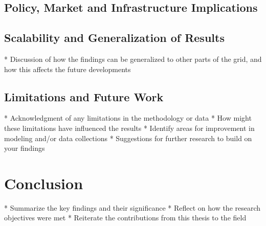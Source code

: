 \subsection{Policy, Market and Infrastructure Implications}

\subsection{Scalability and Generalization of Results}
* Discussion of how the findings can be generalized to other parts of the grid, and how this affects the future developments

\subsection{Limitations and Future Work}
* Acknowledgment of any limitations in the methodology or data
* How might these limitations have influenced the results
* Identify areas for improvement in modeling and/or data collections
* Suggestions for further research to build on your findings




\section{Conclusion}
* Summarize the key findings and their significance
* Reflect on how the research objectives were met
* Reiterate the contributions from this thesis to the field
